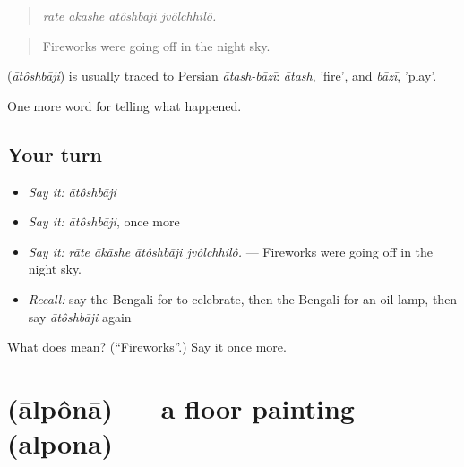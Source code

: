\begin{quote}
   
\end{quote}

\begin{quote}
\emph{rāte ākāshe ātôshbāji jvôlchhilô.}
\end{quote}

\begin{quote}
Fireworks were going off in the night sky.
\end{quote}

\begin{cousinweb}
\textbf{} (\emph{ātôshbāji}) is usually traced to Persian \emph{ātash-bāzī}: \emph{ātash}, 'fire', and \emph{bāzī}, 'play'.
\end{cousinweb}

\begin{grammarlens}[title={What you've built}]
One more word for telling what happened.
\end{grammarlens}

\subsection*{Your turn}
\begin{itemize}
\raggedright
  \item \emph{Say it:} \emph{ātôshbāji}
  \item \emph{Say it:} \emph{ātôshbāji}, once more
  \item \emph{Say it:} \emph{rāte ākāshe ātôshbāji jvôlchhilô.} — Fireworks were going off in the night sky.
  \item \emph{Recall:} say the Bengali for to celebrate, then the Bengali for an oil lamp, then say \emph{ātôshbāji} again
\end{itemize}

\begin{tcolorbox}[breakable,colback=teal!4,colframe=teal!35!black,title={Before you move on}]
What does  mean? (\textquotedblleft{}Fireworks\textquotedblright{}.) Say it once more.
\end{tcolorbox}
\section[\texorpdfstring{\bn{আলপনা} (ālpônā)}{আলপনা (ālpônā)}]{ (ālpônā) — a floor painting (alpona)}

\label{lesson:BN-C305-alpona}




